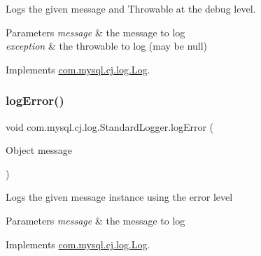 Logs the given message and Throwable at the \textquotesingle{}debug\textquotesingle{} level.


\begin{DoxyParams}{Parameters}
{\em message} & the message to log \\
\hline
{\em exception} & the throwable to log (may be null) \\
\hline
\end{DoxyParams}


Implements \mbox{\hyperlink{interfacecom_1_1mysql_1_1cj_1_1log_1_1_log_a42c9900bc643b771d7e337686ac4f799}{com.\+mysql.\+cj.\+log.\+Log}}.

\mbox{\label{classcom_1_1mysql_1_1cj_1_1log_1_1_standard_logger_a190ac11ebc3b482ff9016af3e9a14ca4}} 
\subsubsection{\texorpdfstring{log\+Error()}{logError()}\hspace{0.1cm}{\footnotesize\ttfamily [1/2]}}
{\footnotesize\ttfamily void com.\+mysql.\+cj.\+log.\+Standard\+Logger.\+log\+Error (\begin{DoxyParamCaption}\item[{Object}]{message }\end{DoxyParamCaption})}

Logs the given message instance using the \textquotesingle{}error\textquotesingle{} level


\begin{DoxyParams}{Parameters}
{\em message} & the message to log \\
\hline
\end{DoxyParams}


Implements \mbox{\hyperlink{interfacecom_1_1mysql_1_1cj_1_1log_1_1_log_ab6f35d1efab89f0c0316106fa4a15d2c}{com.\+mysql.\+cj.\+log.\+Log}}.

\mbox{\label{classcom_1_1mysql_1_1cj_1_1log_1_1_standard_logger_a536975e1d72a19baef92a859e27d2e7a}} 
